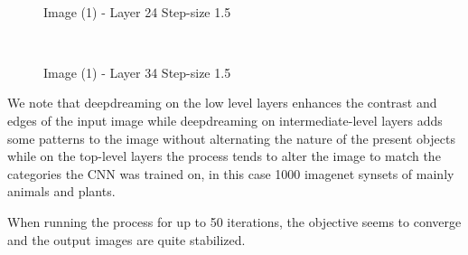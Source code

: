 \documentclass[10pt]{article}
\begin{document}
	\begin{figure}[H]
	    \centering
	 	\\
	    \caption{Image (1) - Layer 24 Step-size 1.5}
	\end{figure}

	\begin{figure}[H]
	    \centering
	 	\\
	    \caption{Image (1) - Layer 34 Step-size 1.5}
	\end{figure}
	We note that deepdreaming on the low level layers enhances the contrast and edges of the input image while deepdreaming on intermediate-level layers adds some patterns to the image without alternating the nature of the present objects while on the top-level layers the process tends to alter the image to match the categories the CNN was trained on, in this case 1000 imagenet synsets of mainly animals and plants.

	When running the process for up to 50 iterations, the objective seems to converge and the output images are quite stabilized.
\end{document}

